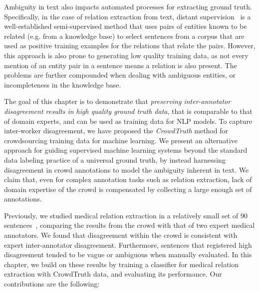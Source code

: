 Ambiguity in text also impacts automated processes for extracting ground truth.  Specifically, in the case of relation extraction from text, distant supervision~\cite{mintz2009distant,Welty:2010:LSR} is a well-established semi-supervised method that uses pairs of entities known to be related (e.g. from a knowledge base) to select sentences from a corpus that are used as positive training examples for the relations that relate the pairs. However, this approach is also prone to generating low quality training data, as not every mention of an entity pair in a sentence means a relation is also present. The problems are further compounded when dealing with ambiguous entities, or incompleteness in the knowledge base.

The goal of this chapter is to demonstrate that \textit{preserving inter-annotator disagreement results in high quality ground truth data}, that is comparable to that of domain experts, and can be used as training data for NLP models. To capture inter-worker disagreement, we have proposed the {\em CrowdTruth} method for crowdsourcing training data for machine learning. We present an alternative approach for guiding supervised machine learning systems beyond the standard data labeling practice of a universal ground truth, by instead harnessing disagreement in crowd annotations to model the ambiguity inherent in text.  We claim that, even for complex annotation tasks such as relation extraction, lack of domain expertise of the crowd is compensated by collecting a large enough set of annotations.

Previously, we studied medical relation extraction in a relatively small set of 90 sentences~\cite{aroyo2013measuring}, comparing the results from the crowd with that of two expert medical annotators. We found that disagreement within the crowd is consistent with expert inter-annotator disagreement. Furthermore, sentences that registered high disagreement tended to be vague or ambiguous when manually evaluated. In this chapter, we build on these results by training a classifier for medical relation extraction with CrowdTruth data, and evaluating its performance. Our contributions are the following:

